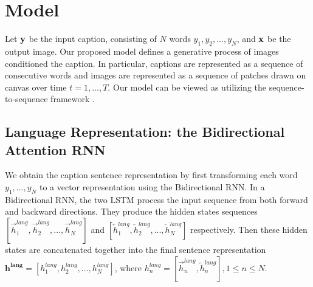 \documentclass{article} %
\newcommand{\hlang}{h^{lang}}
\newcommand{\hlangall}{\boldsymbol{h^{lang}}}
\newcommand{\icaption}{{\bf{y}}}
\newcommand{\oimage}{{\bf{x}}}
\begin{document}
\vspace{-0.1in}
\section{Model}

Let $\icaption$ be the input caption, consisting of $N$ words $y_{1}, y_{2}, ..., y_{N}$, and $\oimage$ be the output image. Our proposed model 
defines a generative process of images conditioned the caption. In particular, captions are represented as a sequence of consecutive words and images are represented as a sequence of patches drawn on canvas over time $t=1,...,T$. Our model can be viewed as utilizing the  sequence-to-sequence framework \citep{ilya_mt}.  

\vspace{-0.1in}
\subsection{Language Representation: the Bidirectional Attention RNN}
\label{sec:lang}
We obtain the caption sentence representation by first transforming each word $y_{1},...,y_{N}$ to a vector representation using the Bidirectional RNN. In a Bidirectional RNN, the two LSTM process the input sequence from both forward and backward directions. They produce the hidden states sequences $[\overrightarrow{h}^{lang}_{1}, \overrightarrow{h}^{lang}_{2}, ..., \overrightarrow{h}^{lang}_{N}]$ and $[\overleftarrow{h}^{lang}_{1}, \overleftarrow{h}^{lang}_{2}, ..., \overleftarrow{h}^{lang}_{N}]$ respectively. Then these hidden states are concatenated together into the final sentence representation $\hlangall = [\hlang_{1}, \hlang_{2}, ..., \hlang_{N}]$, where $\hlang_{n} = [\overrightarrow{h}^{lang}_{n}, \overleftarrow{h}^{lang}_{n}], 1\leq n\leq N$.

\vspace{-0.1in}
\end{document}
